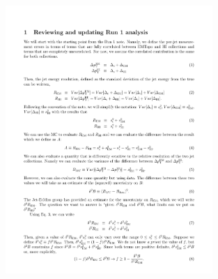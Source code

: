 \begin{figure}
\includegraphics[page=3,width=0.7\textwidth]{figures/appendixHIJERDerivation/JERUncertaintyNote} 
\end{figure}
